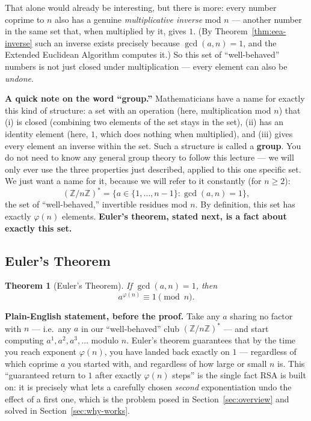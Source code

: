 \documentclass[11pt]{article}
\newtheorem{theorem}{Theorem}[section]
\theoremstyle{definition}
\theoremstyle{remark}
\begin{document}
That alone would already be interesting, but there is more: every number coprime to $n$ also has a genuine \emph{multiplicative inverse} mod $n$ — another number in the same set that, when multiplied by it, gives $1$. (By Theorem~\ref{thm:eea-inverse} such an inverse exists precisely because $\gcd(a,n)=1$, and the Extended Euclidean Algorithm computes it.) So this set of ``well-behaved'' numbers is not just closed under multiplication — every element can also be \emph{undone}.

\medskip\noindent\textbf{A quick note on the word ``group.''} Mathematicians have a name for exactly this kind of structure: a set with an operation (here, multiplication mod $n$) that (i) is closed (combining two elements of the set stays in the set), (ii) has an identity element (here, $1$, which does nothing when multiplied), and (iii) gives every element an inverse within the set. Such a structure is called a \textbf{group}. You do not need to know any general group theory to follow this lecture — we will only ever use the three properties just described, applied to this one specific set. We just want a name for it, because we will refer to it constantly (for $n\ge2$):
\[
(\mathbb{Z}/n\mathbb{Z})^{*} = \{a \in \{1,\dots,n-1\} : \gcd(a,n)=1\},
\]
the set of ``well-behaved,'' invertible residues mod $n$. By definition, this set has exactly $\varphi(n)$ elements. \textbf{Euler's theorem, stated next, is a fact about exactly this set.}

\subsection{Euler's Theorem}


\begin{theorem}[Euler's Theorem]\label{thm:euler}
If $\gcd(a, n) = 1$, then
\[
a^{\varphi(n)} \equiv 1 \pmod{n}.
\]
\end{theorem}

\medskip\noindent\textbf{Plain-English statement, before the proof.} Take any $a$ sharing no factor with $n$ — i.e.\ any $a$ in our ``well-behaved'' club $(\mathbb{Z}/n\mathbb{Z})^{*}$ — and start computing $a^1, a^2, a^3,\dots$ modulo $n$. Euler's theorem guarantees that by the time you reach exponent $\varphi(n)$, you have landed back exactly on $1$ — regardless of which coprime $a$ you started with, and regardless of how large or small $n$ is. This ``guaranteed return to $1$ after exactly $\varphi(n)$ steps'' is the single fact RSA is built on: it is precisely what lets a carefully chosen \emph{second} exponentiation undo the effect of a first one, which is the problem posed in Section~\ref{sec:overview} and solved in Section~\ref{sec:why-works}.
\end{document}
